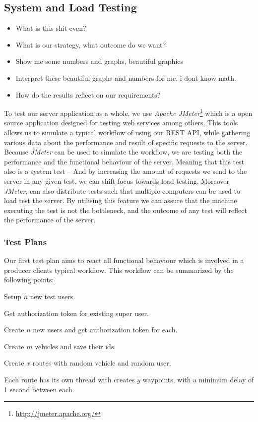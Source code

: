 \subsection{System and Load Testing}
\begin{itemize}
    \item What is this shit even? \checkmark
    \item What is our strategy, what outcome do we want?
    \item Show me some numbers and graphs, beautiful graphics
    \item Interpret these beautiful graphs and numbers for me, i dont know math.
    \item How do the results reflect on our requirements?
\end{itemize}

To test our server application as a whole, we use \textit{Apache JMeter}\footnote{\url{http://jmeter.apache.org/}} which is a open source application designed for testing web services among others.
This tools allows us to simulate a typical workflow of using our REST API, while gathering various data about the performance and result of specific requests to the server.
Because \textit{JMeter} can be used to simulate the workflow, we are testing both the performance and the functional behaviour of the server.
Meaning that this test also is a system test -- And by increasing the amount of requests we send to the server in any given test, we can shift focus towards load testing.
Moreover \textit{JMeter}, can also distribute tests such that multiple computers can be used to load test the server.
By utilising this feature we can assure that the machine executing the test is not the bottleneck, and the outcome of any test will reflect the performance of the server.

\subsubsection{Test Plans}
Our first test plan aims to react all functional behaviour which is involved in a producer clients typical workflow.
This workflow can be summarized by the following points:
\begin{enumberate}
    \item Setup $n$ new test users.
    \begin{enumberate}
        \item Get authorization token for existing super user.
        \item Create $n$ new users and get authorization token for each.
    \end{enumberate}
    \item Create $m$ vehicles and save their ids.
    \item Create $x$ routes with random vehicle and random user.
    \item Each route has its own thread with creates $y$ waypoints, with a minimum delay of 1 second between each.
\end{enumberate}

